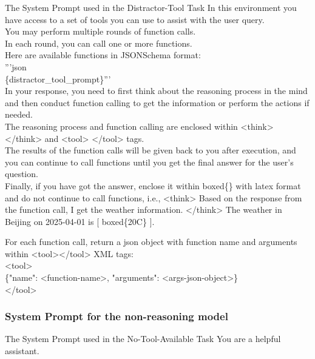 \documentclass[11pt]{article}
\begin{document}
\begin{promptbox}{The System Prompt used in the Distractor-Tool Task}
In this environment you have access to a set of tools you can use to assist with the user query. \\
    You may perform multiple rounds of function calls. \\
    In each round, you can call one or more functions. \\
    Here are available functions in JSONSchema format: \\'''json\\\{distractor\_tool\_prompt\}'''\\
    In your response, you need to first think about the reasoning process in the mind and then conduct function calling to get the information or perform the actions if needed. \\
    The reasoning process and function calling are enclosed within <think> </think> and <tool> </tool> tags. \\
    The results of the function calls will be given back to you after execution,
    and you can continue to call functions until you get the final answer for the user's question. \\
    Finally, if you have got the answer, enclose it within boxed\{\} with latex format and do not continue to call functions, 
    i.e., <think> Based on the response from the function call, I get the weather information. </think> The weather in Beijing on 2025-04-01 is [ boxed\{20C\} ].

    For each function call, return a json object with function name and arguments within <tool></tool> XML tags:\\
    <tool>\\
    \{"name": <function-name>, "arguments": <args-json-object>\}\\
    </tool>
\end{promptbox}

\subsubsection{System Prompt for the non-reasoning model} 

\begin{promptbox}{The System Prompt used in the No-Tool-Available Task}
You are a helpful assistant.
\end{promptbox}
\end{document}
